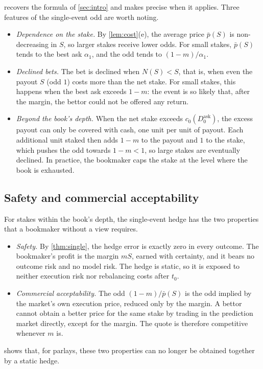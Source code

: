 \documentclass[11pt,a4paper]{article}
\theoremstyle{plain}
\theoremstyle{definition}
\theoremstyle{remark}
\newcommand{\1}{\mathbf{1}}
\begin{document}
 recovers the formula of \cref{sec:intro} and makes precise when it applies. Three features of the single-event odd are worth noting.
\begin{itemize}
  \item \emph{Dependence on the stake.} By \cref{lem:cost}(e), the average price $\bar p(S)$ is non-decreasing in $S$, so larger stakes receive lower odds. For small stakes, $\bar p(S)$ tends to the best ask $\alpha_1$, and the odd tends to $(1-m)/\alpha_1$.
  \item \emph{Declined bets.} The bet is declined when $N(S)<S$, that is, when even the payout $S$ (odd $1$) costs more than the net stake. For small stakes, this happens when the best ask exceeds $1-m$: the event is so likely that, after the margin, the bettor could not be offered any return.
  \item \emph{Beyond the book's depth.} When the net stake exceeds $c_0(D^{\mathrm{ask}}_0)$, the excess payout can only be covered with cash, one unit per unit of payout. Each additional unit staked then adds $1-m$ to the payout and $1$ to the stake, which pushes the odd towards $1-m<1$, so large stakes are eventually declined. In practice, the bookmaker caps the stake at the level where the book is exhausted.
\end{itemize}

\subsection{Safety and commercial acceptability}

For stakes within the book's depth, the single-event hedge has the two properties that a bookmaker without a view requires.
\begin{itemize}
  \item \emph{Safety.} By \cref{thm:single}, the hedge error is exactly zero in every outcome. The bookmaker's profit is the margin $mS$, earned with certainty, and it bears no outcome risk and no model risk. The hedge is static, so it is exposed to neither execution risk nor rebalancing costs after $t_0$.
  \item \emph{Commercial acceptability.} The odd $(1-m)/\bar p(S)$ is the odd implied by the market's own execution price, reduced only by the margin. A bettor cannot obtain a better price for the same stake by trading in the prediction market directly, except for the margin. The quote is therefore competitive whenever $m$ is.
\end{itemize}
 shows that, for parlays, these two properties can no longer be obtained together by a static hedge.
\end{document}
